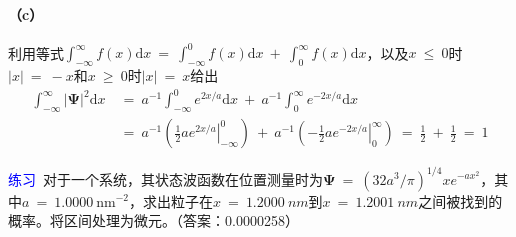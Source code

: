 \documentclass[12pt,a4paper,openany]{ctexbook}
\begin{document}
\begin{flushleft}
\begin{examplebox}
\paragraph{（c）}
利用等式$\int_{-\infty}^{\infty}f(x)\mathrm{d}x\ =\ \int_{-\infty}^0f(x)\mathrm{d}x\ +\ \int_{0}^{\infty}f(x)\mathrm{d}x$，以及$x\ \leq\ 0$时$\left|x\right|\ =\ -x$和$x\ \geq\ 0$时$\left|x\right|\ =\ x$给出
\begin{align*}
    \int_{-\infty}^{\infty}\left|\bm{\Psi}\right|^2\mathrm{d}x\ &=\ a^{-1}\int_{-\infty}^0e^{2x/a}\mathrm{d}x\ +\ a^{-1}\int_{0}^{\infty}e^{-2x/a}\mathrm{d}x \\
    &=\ a^{-1}(\left.\frac{1}{2}ae^{2x/a}\right|_{-\infty}^0)\ +\ a^{-1}(\left.-\frac{1}{2}ae^{-2x/a}\right|_0^{\infty})\ =\ \frac{1}{2}\ +\ \frac{1}{2}\ =\ 1
\end{align*}

\textcolor{blue}{\large 练习}\ 对于一个系统，其状态波函数在位置测量时为$\bm{\Psi}\ =\ (32a^3/\pi)^{1/4}xe^{-ax^2}$，其中$a\ =\ 1.0000\ \text{nm}^{-2}$，求出粒子在$x\ =\ 1.2000\ nm$到$x\ =\ 1.2001\ nm$之间被找到的概率。将区间处理为微元。（答案：0.0000258）
\end{examplebox}
\end{flushleft}
\end{document}
